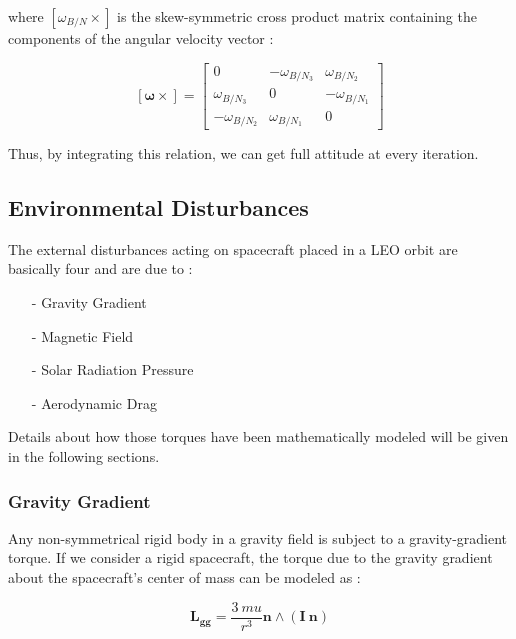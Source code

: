 where $[\omega_{B/N} \times]$ is the skew-symmetric cross product matrix containing the components of the angular velocity vector : 

\begin{equation*}
 \mathbf{[\omega \times]} =
                                \begin{bmatrix}
                                    0 & -\omega_{B/N_{3}} & \omega_{B/N_{2}} \\
                                    \omega_{B/N_{3}} & 0 & -\omega_{B/N_{1}} \\
                                    -\omega_{B/N_{2}} & \omega_{B/N_{1}} & 0
                                \end{bmatrix}
\end{equation*}

Thus, by integrating this relation, we can get full attitude at every iteration.

\subsection{Environmental Disturbances} \label{sec:disturbances}
The external disturbances acting on spacecraft placed in a LEO orbit are basically four and are due to :

\begin{itemize}
  \item[-] Gravity Gradient
  \item[-] Magnetic Field 
  \item[-] Solar Radiation Pressure
  \item[-] Aerodynamic Drag
\end{itemize}

Details about how those torques have been mathematically modeled will be given in the following sections.

\subsubsection{Gravity Gradient}
Any non-symmetrical rigid body in a gravity field is subject to a gravity-gradient torque.
If we consider a rigid spacecraft, the torque due to the gravity gradient about the spacecraft's center of mass can be modeled as :

\begin{equation}
 \mathbf{L_{gg}} = \frac{3 \ mu}{r^3} \mathbf{n} \wedge (\mathbf{I} \ \mathbf{n})
\end{equation}

